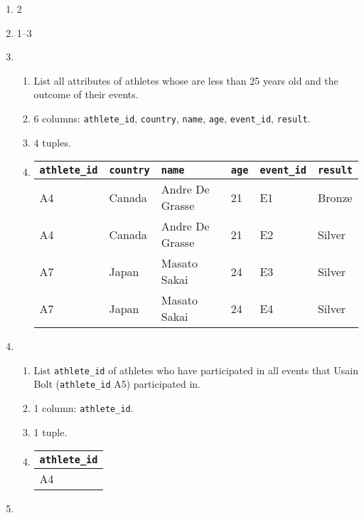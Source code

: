 \documentclass{article}
\begin{document}
\begin{enumerate}
    \item 2
    \item 1--3
    \item
    \begin{enumerate}
        \item List all attributes of athletes whose are less than 25 years old and the outcome of their events.
        \item 6 columns: \texttt{athlete\_id}, \texttt{country}, \texttt{name}, \texttt{age}, \texttt{event\_id}, \texttt{result}.
        \item 4 tuples.
        \item
        \begin{tabular}{@{}llllll@{}}
            \toprule
            \texttt{athlete\_id} & \texttt{country} & \texttt{name}            & \texttt{age} & \texttt{event\_id} & \texttt{result} \\ \midrule
            A4          & Canada  & Andre De Grasse & 21  & E1        & Bronze \\
            A4          & Canada  & Andre De Grasse & 21  & E2        & Silver \\
            A7          & Japan   & Masato Sakai    & 24  & E3        & Silver \\
            A7          & Japan   & Masato Sakai    & 24  & E4        & Silver \\ \bottomrule
        \end{tabular}
    \end{enumerate}
    \item
    \begin{enumerate}
        \item List \texttt{athlete\_id} of athletes who have participated in all events that Usain Bolt (\texttt{athlete\_id} A5) participated in.
        \item 1 column: \texttt{athlete\_id}.
        \item 1 tuple.
        \item 
        \begin{tabular}{@{}l@{}}
            \toprule
            \texttt{athlete\_id} \\ \midrule
            A4          \\ \bottomrule
        \end{tabular}
    \end{enumerate}
    \item
    \begin{enumerate}

\end{enumerate}
\end{enumerate}
\end{document}
